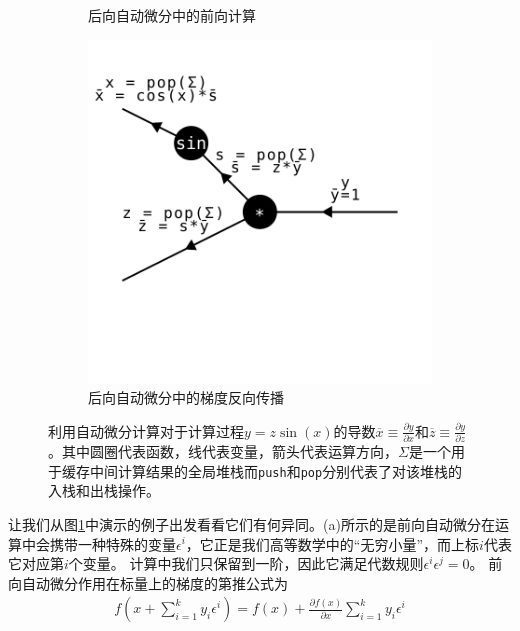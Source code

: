 \documentclass[A4,twoside,fontset=ubuntu,UTF8]{ctexart}
\begin{document}
\begin{figure}[t]
\begin{subfigure}[b]{0.32\textwidth}
    \caption{\small 后向自动微分中的前向计算}
\end{subfigure}
\begin{subfigure}[b]{0.32\textwidth}
    \centering
    \includegraphics[width=\textwidth, trim={0 3cm 1cm 1cm}, clip]{./backward-backward.pdf}
    \caption{\small 后向自动微分中的梯度反向传播}
\end{subfigure}
        \caption{利用自动微分计算对于计算过程$y = z \sin(x)$的导数$\overline{x}\equiv \frac{\partial y}{\partial x}$和$\overline{z}\equiv \frac{\partial y}{\partial z}$。其中圆圈代表函数，线代表变量，箭头代表运算方向，$\Sigma$是一个用于缓存中间计算结果的全局堆栈而\texttt{push}和\texttt{pop}分别代表了对该堆栈的入栈和出栈操作。\label{fig:autodifftypes}} 
\end{figure}

让我们从图\ref{fig:autodifftypes}中演示的例子出发看看它们有何异同。(a)所示的是前向自动微分在运算中会携带一种特殊的变量$\epsilon^i$，它正是我们高等数学中的“无穷小量”，而上标$i$代表它对应第$i$个变量。
计算中我们只保留到一阶，因此它满足代数规则$\epsilon^i\epsilon^j = 0$。
前向自动微分作用在标量上的梯度的第推公式为
\begin{align}
    f(x+\sum\limits^k_{i=1} y_i \epsilon^i) = f(x) + \frac{\partial f(x)}{\partial x} \sum\limits^k_{i=1}y_i\epsilon^i
\end{align}
\end{document}
